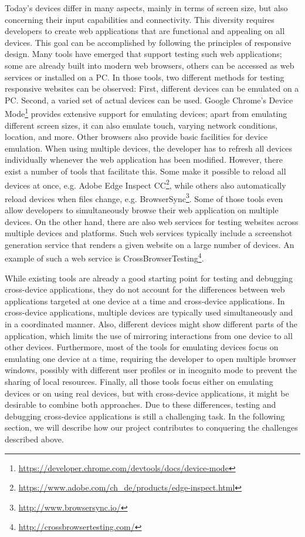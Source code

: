 Today's devices differ in many aspects, mainly in terms of screen size, but also concerning their input capabilities and connectivity. This diversity requires developers to create web applications that are functional and appealing on all devices. This goal can be accomplished by following the principles of responsive design. Many tools have emerged that support testing such web applications; some are already built into modern web browsers, others can be accessed as web services or installed on a PC. In those tools, two different methods for testing responsive websites can be observed: First, different devices can be emulated on a PC. Second, a varied set of actual devices can be used. Google Chrome's Device Mode\footnote{\url{https://developer.chrome.com/devtools/docs/device-mode}} provides extensive support for emulating devices; apart from emulating different screen sizes, it can also emulate touch, varying network conditions, location, and more. Other browsers also provide basic facilities for device emulation. When using multiple devices, the developer has to refresh all devices individually whenever the web application has been modified. However, there exist a number of tools that facilitate this. Some make it possible to reload all devices at once, e.g. Adobe Edge Inspect CC\footnote{\url{https://www.adobe.com/ch_de/products/edge-inspect.html}}, while others also automatically reload devices when files change, e.g. BrowserSync\footnote{\url{http://www.browsersync.io/}}. Some of those tools even allow developers to simultaneously browse their web application on multiple devices. On the other hand, there are also web services for testing websites across multiple devices and platforms. Such web services typically include a screenshot generation service that renders a given website on a large number of devices. An example of such a web service is CrossBrowserTesting\footnote{\url{http://crossbrowsertesting.com/}}.

While existing tools are already a good starting point for testing and debugging cross-device applications, they do not account for the differences between web applications targeted at one device at a time and cross-device applications. In cross-device applications, multiple devices are typically used simultaneously and in a coordinated manner. Also, different devices might show different parts of the application, which limits the use of mirroring interactions from one device to all other devices. Furthermore, most of the tools for emulating devices focus on emulating one device at a time, requiring the developer to open multiple browser windows, possibly with different user profiles or in incognito mode to prevent the sharing of local resources. Finally, all those tools focus either on emulating devices or on using real devices, but with cross-device applications, it might be desirable to combine both approaches. Due to these differences, testing and debugging cross-device applications is still a challenging task. In the following section, we will describe how our project contributes to conquering the challenges described above.

